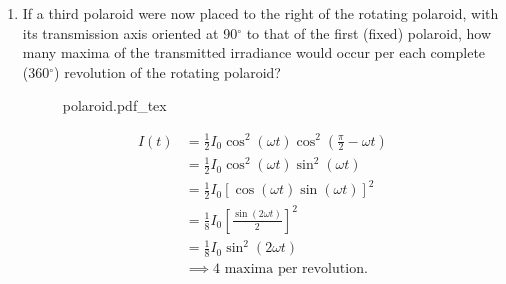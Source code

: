 \documentclass{article}
\newcommand{\incfig}[2][1]{%
    \def\svgwidth{#1\columnwidth}
    {#2.pdf_tex}
}
\begin{document}
\begin{enumerate}
\begin{enumerate}
      \item If a third polaroid were now placed to the right of the rotating
        polaroid, with its transmission axis oriented at 90$^{\circ}$ to that of the
        first (fixed) polaroid, how many maxima of the transmitted irradiance
        would occur per each complete (360$^{\circ}$) revolution of the rotating
        polaroid?
        \begin{figure}[H]
          \centering
          \incfig[0.75]{polaroid}
          \caption{}
          \label{fig:polaroid}
        \end{figure}
        \begin{align}
          I(t) &= \frac{1}{2} I_0 \cos^2(\omega t)\cos^2(\frac{\pi}{2}-\omega t) \\
               &= \frac{1}{2} I_0 \cos^2(\omega t)\sin^2(\omega t) \\
               &= \frac{1}{2} I_0 \left[ \cos(\omega t)\sin(\omega t) \right]^2 \\
               &= \frac{1}{8} I_0 \left[\frac{\sin(2\omega t)}{2}\right]^2\\
               &= \frac{1}{8} I_0 \sin^2(2\omega t)\\
               &\implies \text{4 maxima per revolution}
        .\end{align}
    \end{enumerate}

\end{enumerate}
\end{document}
